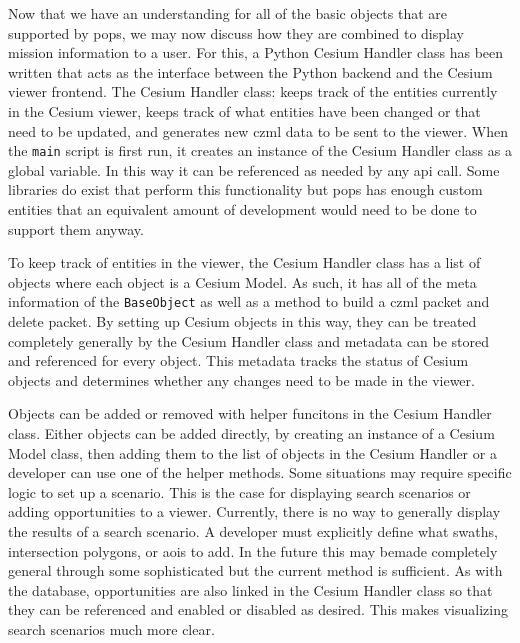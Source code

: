 Now that we have an understanding for all of the basic objects that are
supported by \gls{pops}, we may now discuss how they are combined to display
mission information to a user. For this, a Python Cesium Handler class has been
written that acts as the interface between the Python backend and the Cesium
viewer frontend. The Cesium Handler class: keeps track of the entities
currently in the Cesium viewer, keeps track of what entities have been changed
or that need to be updated, and generates new \gls{czml} data to be sent to the
viewer. When the \texttt{main} script is first run, it creates an instance of
the Cesium Handler class as a global variable. In this way it can be referenced
as needed by any api call. Some libraries do exist that perform this
functionality but \gls{pops} has enough custom entities that an equivalent
amount of development would need to be done to support them anyway.

To keep track of entities in the viewer, the Cesium Handler class has a list of
objects where each object is a Cesium Model. As such, it has all of the meta
information of the \texttt{BaseObject} as well as a method to build a
\gls{czml} packet and delete packet. By setting up Cesium objects in this way,
they can be treated completely generally by the Cesium Handler class and
metadata can be stored and referenced for every object. This metadata tracks
the status of Cesium objects and determines whether any changes need to be made
in the viewer. 

Objects can be added or removed with helper funcitons in the Cesium Handler
class. Either objects can be added directly, by creating an instance of a
Cesium Model class, then adding them to the list of objects in the Cesium
Handler or a developer can use one of the helper methods. Some situations may
require specific logic to set up a scenario. This is the case for displaying
search scenarios or adding opportunities to a viewer. Currently, there is no
way to generally display the results of a search scenario. A developer must
explicitly define what swaths, intersection polygons, or \glspl{aoi} to add. In
the future this may bemade completely general through some sophisticated but
the current method is sufficient. As with the database, opportunities are also
linked in the Cesium Handler class so that they can be referenced and enabled
or disabled as desired. This makes visualizing search scenarios much more
clear. 

